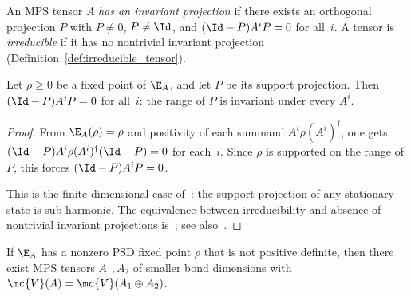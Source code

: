 \begin{definition}\label{def:has_inv_proj}
    \leanok
    An MPS tensor $A$ \emph{has an invariant projection} if there exists an
    orthogonal projection $P$ with $P \neq 0$, $P \neq \Id$, and
    $(\Id - P) A^i P = 0$ for all~$i$. A tensor is \emph{irreducible} if it has
    no nontrivial invariant projection (Definition~\ref{def:irreducible_tensor}).
\end{definition}

\begin{theorem}\label{thm:fp_inv_proj}
    \leanok
    Let $\rho \ge 0$ be a fixed point of $\E_A$, and let $P$ be its support
    projection. Then $(\Id - P) A^i P = 0$ for all~$i$: the range of $P$ is
    invariant under every $A^i$.
\end{theorem}

\begin{proof}
    \leanok
    From $\E_A(\rho) = \rho$ and positivity of each summand
    $A^i \rho (A^i)^\dagger$, one gets
    $(\Id - P) A^i \rho (A^i)^\dagger (\Id - P) = 0$ for each~$i$. Since $\rho$
    is supported on the range of $P$, this forces $(\Id - P) A^i P = 0$.

    This is the finite-dimensional case of~\cite[Proposition~6.10]{Wolf2012Quantum}:
    the support projection of any stationary state is sub-harmonic. The
    equivalence between irreducibility and absence of nontrivial invariant
    projections is~\cite[Theorem~6.2]{Wolf2012Quantum}; see
    also~\cite[Section~IV.A.1]{Cirac2021Matrix}.
\end{proof}

\begin{theorem}\label{thm:two_block_decomp}
    \leanok
    If $\E_A$ has a nonzero PSD fixed point $\rho$ that is not positive definite,
    then there exist MPS tensors $A_1, A_2$ of smaller bond dimensions with
    $\mc{V}(A) = \mc{V}(A_1 \oplus A_2)$.
\end{theorem}

